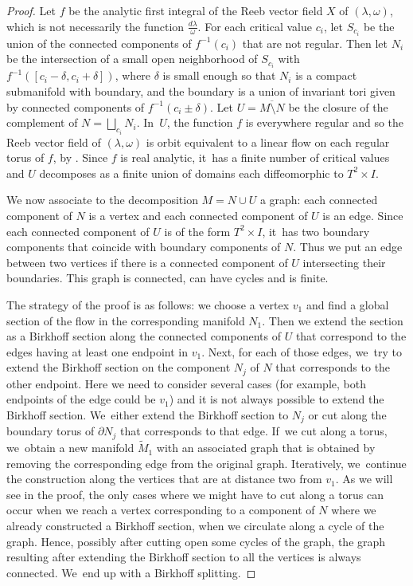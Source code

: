 \begin{proof}
Let $f$ be the analytic first integral of the Reeb vector field $X$ of $(\lambda, \omega)$, which is not necessarily the function $\frac{d\lambda}{\omega}$. For each critical value $c_i$, let $S_{c_i}$ be the union of the connected components of $f^{-1}(c_i)$ that are not regular. Then let $N_i$ be the intersection of a small open neighborhood of $S_{c_i}$ with $f^{-1}([c_i-\delta,c_i+\delta])$, where $\delta$ is small enough so that $N_i$ is a compact submanifold with boundary, and the boundary is a union of invariant tori given by connected components of $f^{-1}(c_i \pm \delta)$. Let $U=\overline{M\setminus N}$ be the closure of the complement of $N=\bigsqcup_{c_i}N_i$. In~$U$, the function $f$ is everywhere regular and so the Reeb vector field of $(\lambda,\omega)$ is orbit equivalent to a linear flow on each regular torus of $f$, \eg by \cite[Th.\,3.3]{CV1}. Since $f$ is real analytic, it~has a finite number of critical values and $U$ decomposes as a finite union of domains each diffeomorphic to $T^2\times I$.

We now associate to the decomposition $M=N\cup U$ a graph: each connected component of $N$ is a vertex and each connected component of $U$ is an edge. Since each connected component of $U$ is of the form $T^2\times I$, it~has two boundary components that coincide with boundary components of $N$. Thus we put an edge between two vertices if there is a connected component of $U$ intersecting their boundaries. This graph is connected, can have cycles and is finite.

The strategy of the proof is as follows: we choose a vertex $v_1$ and find a global section of the flow in the corresponding manifold $N_1$. Then we extend the section as a Birkhoff section along the connected components of $U$ that correspond to the edges having at least one endpoint in $v_1$. Next, for each of those edges, we~try to extend the Birkhoff section on the component $N_j$ of $N$ that corresponds to the other endpoint. Here we need to consider several cases (for example, both endpoints of the edge could be $v_1$) and it is not always possible to extend the Birkhoff section. We~either extend the Birkhoff section to $N_j$ or cut along the boundary torus of $\partial N_j$ that corresponds to that edge. If~we cut along a torus, we~obtain a new manifold $\widetilde M_1$ with an associated graph that is obtained by removing the corresponding edge from the original graph. Iteratively, we~continue the construction along the vertices that are at distance two from $v_1$. As we will see in the proof, the only cases where we might have to cut along a torus can occur when we reach a vertex corresponding to a component of $N$ where we already constructed a Birkhoff section, \ie when we circulate along a cycle of the graph. Hence, possibly after cutting open some cycles of the graph, the graph resulting after extending the Birkhoff section to all the vertices is always connected. We~end up with a Birkhoff splitting.


\end{proof}
